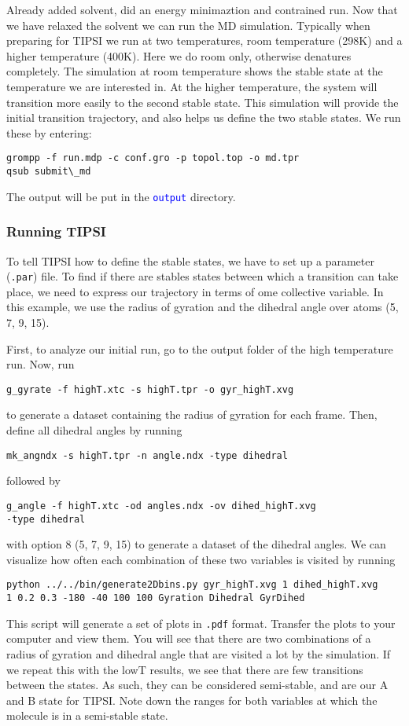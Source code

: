 \documentclass[]{article}
\begin{document}
Already added solvent, did an energy minimaztion and contrained run. Now that we have relaxed the solvent we can run the MD simulation. Typically when preparing for \textsc{TIPSI} we run at two temperatures, room temperature (298K) and a higher temperature (400K). Here we do room only, otherwise denatures completely. The simulation at room temperature shows the stable state at the temperature we are interested in. At the higher temperature, the system will transition more easily to the second stable state. This simulation will provide the initial transition trajectory, and also helps us define the two stable states. We run these by entering:
%
\begin{lstlisting}
grompp -f run.mdp -c conf.gro -p topol.top -o md.tpr
qsub submit\_md
\end{lstlisting}
%
The output will be put in the \texttt{\textcolor{blue}{output}} directory.

\subsubsection*{Running TIPSI}

To tell \textsc{TIPSI} how to define the stable states, we have to set up a parameter (\texttt{.par}) file. To find if there are stables states between which a transition can take place, we need to express our trajectory in terms of ome collective variable. In this example, we use the radius of gyration and the dihedral angle over atoms (5, 7, 9, 15).

First, to analyze our initial run, go to the output folder of the high temperature run. Now, run
%
\begin{lstlisting}
g_gyrate -f highT.xtc -s highT.tpr -o gyr_highT.xvg
\end{lstlisting}
%
to generate a dataset containing the radius of gyration for each frame. Then, define all dihedral angles by running
%
\begin{lstlisting}
mk_angndx -s highT.tpr -n angle.ndx -type dihedral
\end{lstlisting}
%
followed by
%
\begin{lstlisting}
g_angle -f highT.xtc -od angles.ndx -ov dihed_highT.xvg 
-type dihedral
\end{lstlisting}
%
with option 8 (5, 7, 9, 15) to generate a dataset of the dihedral angles. We can visualize how often each combination of these two variables is visited by running
%
\begin{lstlisting}
python ../../bin/generate2Dbins.py gyr_highT.xvg 1 dihed_highT.xvg 
1 0.2 0.3 -180 -40 100 100 Gyration Dihedral GyrDihed
\end{lstlisting}
%
This script will generate a set of plots in \texttt{.pdf} format. Transfer the plots to your computer and view them. You will see that there are two combinations of a radius of gyration and dihedral angle that are visited a lot by the simulation. If we repeat this with the lowT results, we see that there are few transitions between the states. As such, they can be considered semi-stable, and are our A and B state for \textsc{TIPSI}. Note down the ranges for both variables at which the molecule is in a semi-stable state.
\end{document}
